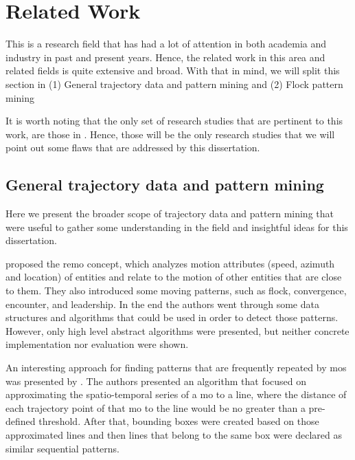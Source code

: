 \chapter{Related Work}
\label{chp:relatedwork}
This is a research field that has had a lot of attention in both academia and industry in past and present years. Hence,
the related work in this area and related fields is quite extensive and broad. With that in mind, we will split this
section in (1) General trajectory data and pattern mining and (2) Flock pattern mining

It is worth noting that the only set of research studies that are pertinent to this work, are those in
. Hence, those will be the only research studies that we will point out some flaws that are
addressed by this dissertation.

\section{General trajectory data and pattern mining}
\label{sec:rel_general}
Here we present the broader scope of trajectory data and pattern mining that were useful to gather some understanding in
the field and insightful ideas for this dissertation.

 proposed the \ac{remo} concept, which analyzes motion attributes (speed, azimuth and location) of
entities and relate to the motion of other entities that are close to them. They also introduced some moving patterns,
such as flock, convergence, encounter, and leadership. In the end the authors went through some data structures and
algorithms that could be used in order to detect those patterns. However, only high level abstract algorithms were
presented, but neither concrete implementation nor evaluation were shown.

An interesting approach for finding patterns that are frequently repeated by \acp{mo} was presented by
. The authors presented an algorithm that focused on approximating the spatio-temporal
series of a \ac{mo} to a line, where the distance of each trajectory point of that \ac{mo} to the line would be no
greater than a pre-defined threshold. After that, bounding boxes were created based on those approximated lines and then
lines that belong to the same box were declared as similar sequential patterns.

